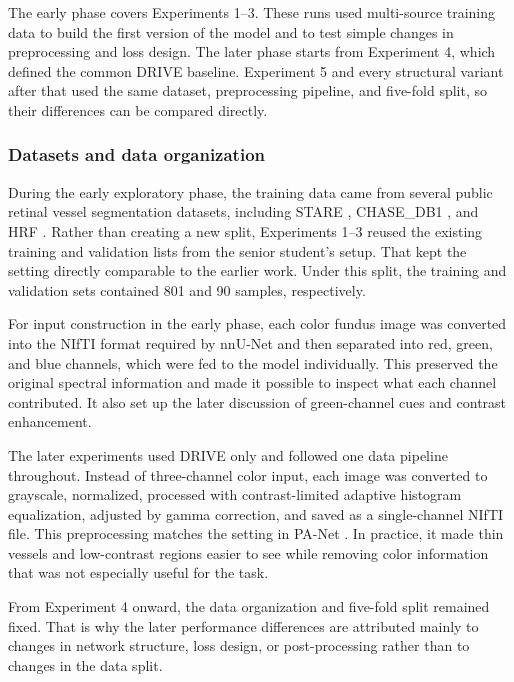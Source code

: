 \documentclass[a4paper,12pt]{article}
\begin{document}
The early phase covers Experiments 1--3. These runs used multi-source training data to build the first version of the model and to test simple changes in preprocessing and loss design. The later phase starts from Experiment 4, which defined the common DRIVE baseline. Experiment 5 and every structural variant after that used the same dataset, preprocessing pipeline, and five-fold split, so their differences can be compared directly.

\subsubsection{Datasets and data organization}

During the early exploratory phase, the training data came from several public retinal vessel segmentation datasets, including STARE \cite{hoover2000locating}, CHASE\_DB1 \cite{fraz2012ensemble}, and HRF \cite{budai2013robust}. Rather than creating a new split, Experiments 1--3 reused the existing training and validation lists from the senior student's setup. That kept the setting directly comparable to the earlier work. Under this split, the training and validation sets contained 801 and 90 samples, respectively.

For input construction in the early phase, each color fundus image was converted into the NIfTI format required by nnU-Net and then separated into red, green, and blue channels, which were fed to the model individually. This preserved the original spectral information and made it possible to inspect what each channel contributed. It also set up the later discussion of green-channel cues and contrast enhancement.

The later experiments used DRIVE only and followed one data pipeline throughout. Instead of three-channel color input, each image was converted to grayscale, normalized, processed with contrast-limited adaptive histogram equalization, adjusted by gamma correction, and saved as a single-channel NIfTI file. This preprocessing matches the setting in PA-Net \cite{luo2025panet}. In practice, it made thin vessels and low-contrast regions easier to see while removing color information that was not especially useful for the task.

From Experiment 4 onward, the data organization and five-fold split remained fixed. That is why the later performance differences are attributed mainly to changes in network structure, loss design, or post-processing rather than to changes in the data split.
\end{document}
